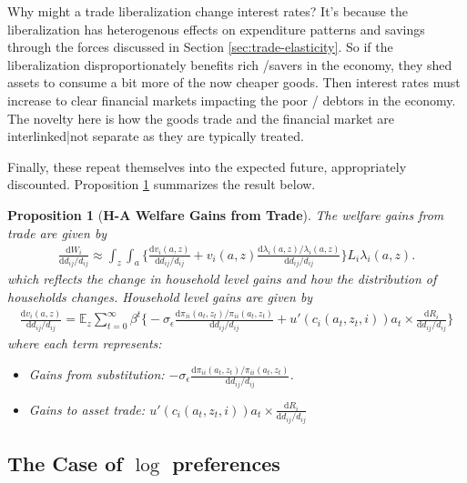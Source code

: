 \documentclass[12pt,pdftex]{article}
\newtheorem{prp}{Proposition}
\begin{document}
\begin{onehalfspacing}
Why might a trade liberalization change interest rates? It's because the liberalization has heterogenous effects on expenditure patterns and savings through the forces discussed in Section \ref{sec:trade-elasticity}. So if the liberalization disproportionately benefits rich /savers in the economy, they shed assets to consume a bit more of the now cheaper goods. Then interest rates must increase to clear financial markets impacting the poor / debtors in the economy. The novelty here is how the goods trade and the financial market are interlinked|not separate as they are typically treated.

Finally, these repeat themselves into the expected future, appropriately discounted. Proposition \ref{prp:gains-trade} summarizes the result below.
\begin{prp}[\textbf{H-A Welfare Gains from Trade}] \label{prp:gains-trade} The welfare gains from trade are given by
{\footnotesize
\begin{align}
\frac{\mathrm{d} W_{i}}{\mathrm{d} d_{ij} / d_{ij}} \approx \int_{z} \int_{a}  \bigg \{ \frac{\mathrm{d} v_i(a, z)}{\mathrm{d} d_{ij} / d_{ij}}  + v_{i}(a,z) \frac{\mathrm{d} \lambda_{i}(a,z)/ \lambda_{i}(a,z)}{\mathrm{d} d_{ij} / d_{ij}}  \bigg \} L_i \lambda_{i}(a,z).
\nonumber
\end{align}
}which reflects the change in household level gains and how the distribution of households changes. Household level gains are given by
{\footnotesize
\begin{align}
\nonumber
\frac{\mathrm{d} v_i(a, z)}{\mathrm{d} d_{ij} / d_{ij}} = \mathbb{E}_{z} \sum_{t = 0}^{\infty} \beta^{t} \bigg \{ -\sigma_{\epsilon} \frac{\mathrm{d} \pi_{ii}(a_{t},z_{t}) / \pi_{ii}(a_{t},z_{t})}{\mathrm{d}d_{ij} / d_{ij}} + u'(c_{i}(a_{t},z_{t},i))a_{t} \times \frac{\mathrm{d} R_{i}}{\mathrm{d} d_{ij} / d_{ij}} \bigg \}
\end{align}
}where each term represents:
\begin{itemize}
\item Gains from substitution: $-\sigma_{\epsilon} \frac{\mathrm{d} \pi_{ii}(a_{t},z_{t}) / \pi_{ii}(a_{t},z_{t})}{\mathrm{d}d_{ij} / d_{ij}}$.

\item Gains to asset trade: $u'(c_{i}(a_{t},z_{t}, i))a_{t} \times \frac{\mathrm{d} R_{i}}{\mathrm{d} d_{ij} / d_{ij}}$
\end{itemize}
\end{prp}

\subsection{The Case of $\log$ preferences}\label{sec:log-preferences}


\end{onehalfspacing}
\end{document}
